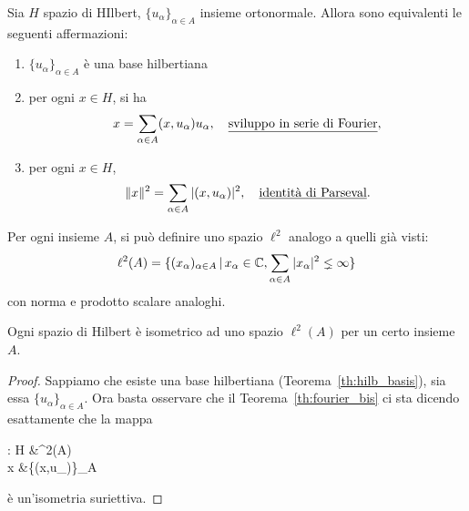 \begin{theorem}
\label{th:fourier_bis}
	Sia $H$ spazio di HIlbert, $\{u_\alpha\}_{\alpha \in A}$ insieme ortonormale.
	Allora sono equivalenti le seguenti affermazioni:
	\begin{enumerate}
		\item $\{u_\alpha\}_{\alpha \in A}$ è una base hilbertiana
		\item per ogni $x \in H$, si ha
		\begin{equation*}
			x= \sum_{\alpha \in A} (x,u_\alpha)u_\alpha, \quad \text{\underline{sviluppo in serie di Fourier}},
		\end{equation*}
		\item per ogni $x \in H$,
		\begin{equation*}
			\|x\|^2 = \sum_{\alpha \in A} |(x,u_\alpha)|^2, \quad \text{\underline{identità di Parseval}}.
		\end{equation*}
	\end{enumerate}
\end{theorem}

Per ogni insieme $A$, si può definire uno spazio $\ell^2$ analogo a quelli già visti:
\begin{equation*}
	\ell^2(A) = \{(x_\alpha)_{\alpha \in A} \,|\, x_\alpha \in \mathbb{C}, \sum_{\alpha \in A}|x_\alpha|^2 \lneq \infty \}
\end{equation*}
con norma e prodotto scalare analoghi.

\begin{theorem}
	Ogni spazio di Hilbert è isometrico ad uno spazio $\ell^2(A)$ per un certo insieme $A$.
\end{theorem}
\begin{proof}
	Sappiamo che esiste una base hilbertiana (Teorema~\ref{th:hilb_basis}), sia essa $\{u_\alpha\}_{\alpha \in A}$. Ora basta osservare che il Teorema~\ref{th:fourier_bis} ci sta dicendo esattamente che la mappa
	\begin{eqalign*}
		\varphi : H &\longto \ell^2(A)\\
				x &\longmapsto \{(x,u_\alpha)\}_{\alpha \in A}
	\end{eqalign*}
	è un'isometria suriettiva.
\end{proof}
